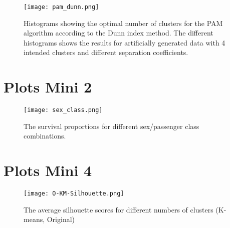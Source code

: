 \documentclass[11pt,twoside,swedish]{article}
\begin{document}
\begin{figure}
\begin{center}
\texttt{[image: pam\_dunn.png]}
\caption{Histograms showing the optimal number of clusters for the PAM
  algorithm according to the Dunn index method. The different
  histograms shows the results for artificially generated data with 4
  intended clusters and different separation coefficients.}
\label{pam_dunn_hists}
\end{center}
\end{figure}


\newpage
\section{Plots Mini 2}\label{Plots Mini 2}

\graphicspath{{/home/mikael/Repos/Courses/msa220/Mini/Mini/Mini_2/Titanic/}}
\begin{figure}[!htb]
\begin{center}
\texttt{[image: sex\_class.png]}
\caption{The survival proportions for different sex/passenger class combinations.}
\label{titanic sex pclass}
\end{center}
\end{figure}

\newpage

\section{Plots Mini 4}\label{Plots Mini 4}

\graphicspath{{/home/mikael/Repos/Courses/msa220/Mini/Mini/Mini_4/TCGA-PANCAN-HiSeq-801x20531/}}
\begin{figure}[!htb]
\centering
\texttt{[image: O-KM-Silhouette.png]}
\caption{The average silhouette scores for different numbers of
  clusters (K-means, Original)}
\end{figure}

\begin{table}[ht]
\centering
{}
\caption{The result of k-means clustering on the original data.}
\end{table}
\end{document}
